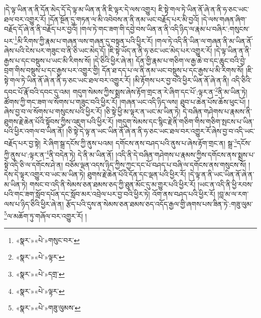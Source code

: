 །དེ་ལྟ་ཡིན་ན་ནི་དོན་མེད་དོ་དེ་ལྟ་མ་ཡིན་ན་ནི་ཇི་ལྟར་དེ་ལས་འགྱུར། ཇི་སྟེ་གལ་ཏེ་ཡིན་ནོ་ཞེ་ན་ནི་ཧ་ཅང་ཡང་ཐལ་བར་འགྱུར་རོ། །དོན་སྔོན་དུ་གཏན་ལ་མི་འབེབས་ན་ནི་ནམ་ཡང་བརྗོད་པར་མི་བྱའོ། །དེ་ལས་གཞན་ཞིག་བརྗོད་དོ་ཞེ་ན་ནི་བརྗོད་པར་བྱའོ། །གལ་ཏེ་གང་ཟག་གི་དབྱེ་བས་ཡིན་ན་ནི་འདི་ཉིད་ལ་རྣམ་པ་བཞིར་:གསུངས་པར་\footnote{«སྣར་»«པེ་»གསུང་བར་}མི་རིགས་ཀྱི་རྣམ་པ་གཞན་ལས་གཞན་དུ་བསྟན་པའི་ཕྱིར་རོ། །གལ་ཏེ་འདི་ནི་ཡིན་ལ་གཞན་ནི་མ་ཡིན་ནོ་ཞེས་པའི་ངེས་པར་གཟུང་བ་ནི་ཅི་ཡང་མེད་དོ། །ཇི་སྟེ་ཡོད་ན་ནི་ཧ་ཅང་ཡང་མེད་པར་འགྱུར་རོ། །དེ་ལྟ་ཡིན་ན་ནི་རྒྱས་པ་དང་བསྡུས་པ་ཡང་མི་རིགས་སོ། །དེ་ཅིའི་ཕྱིར་ཞེ་ན། དོན་གྱི་རྣམ་པ་གཅིག་ལ་རྒྱ་ཆེ་བ་དང་ཆུང་བའི་བྱེ་བྲག་གིས་བསྡུས་པ་དང་རྒྱས་པར་འགྱུར་གྱི། དོན་ཐ་དད་པ་ལ་ནི་ནམ་ཡང་བསྡུས་པ་དང་རྒྱས་པ་མི་རིགས་སོ། །ཇི་སྟེ་གལ་ཏེ་ཡིན་ནོ་ཞེ་ན་ནི་ཧ་ཅང་ཡང་ཐལ་བར་འགྱུར་རོ། །མི་རྟོགས་པར་བྱ་བའི་ཕྱིར་ཡིན་ནོ་ཞེ་ན་ནི། འདི་ཅིའི་དབང་པོ་རྣོ་བའི་དབང་དུ་འམ། གདུག་སེམས་ཀྱིས་སྨྲས་ཞེས་རྟོག་གྲང་ན་རེ་ཞིག་དང་པོ་:ལྟར་ན་\footnote{«སྣར་»«པེ་»ལྟར་}ནི་མ་ཡིན་ཏེ། ཚོགས་ཀྱི་གང་ཟག་ལ་སོགས་པ་གཟུང་བའི་ཕྱིར་རོ། །གཞན་ཡང་འདི་ཉིད་ལས། ཐུབ་པ་ཆེན་པོས་ཆོས་ཕུང་པོ། །ཞེས་བྱ་བ་ལ་སོགས་པ་གསུངས་པའི་ཕྱིར་རོ། །ཅི་སྟེ་ཕྱི་མ་ལྟར་ན་ཡང་མ་ཡིན་ཏེ། དེ་བཞིན་གཤེགས་པ་རྣམས་ནི་ཐུགས་རྗེ་ཆེན་པོའི་སྟོབས་ཀྱིས་འཇུག་པའི་ཕྱིར་རོ། །གདུག་སེམས་དང་སྙིང་རྗེ་ནི་གཅིག་གིས་གཅིག་སྤངས་པ་ཡིན་པའི་ཕྱིར་འགལ་བ་ཡིན་ནོ། །ཅི་སྟེ་དེ་ལྟ་ན་ཡང་ཡིན་ནོ་ཞེ་ན་ནི་ཧ་ཅང་ཡང་ཐལ་བར་འགྱུར་རོ་ཞེས་བྱ་བ་འདི་ཡང་བརྗོད་པར་བྱ་སྟེ། རེ་ཞིག་སྒྲ་དངོས་ཀྱི་ནུས་པའམ། དགོངས་ནས་བཤད་པའི་ནུས་པ་ཞེས་རྟོག་གྲང་ན། སྒྲ་\footnote{«སྣར་»«པེ་»དགྲ་}དངོས་ཀྱི་ནུས་པ་:ལྟར་ན་\footnote{«སྣར་»«པེ་»ལྟར་}ནི་བདེན་ཏེ། དེ་ནི་མ་ཡིན་ནོ། །འདི་ནི་དེ་བཞིན་གཤེགས་པ་རྣམས་ཀྱིས་དགོངས་ནས་སྨྲས་པ་སྟེ་འདི་ཅི་ལ་དགོངས་ཤེ་ན། བཅོམ་ལྡན་འདས་ཉིད་ཀྱིས་ཀྱང་དང་པོ་བཤད་པ་བཞི་ལ་དགོངས་ནས་གསུངས་སོ། །དེས་དེ་ལྟར་འགྱུར་བ་ཡང་མ་ཡིན་ཏེ། ཐུགས་རྗེ་ཆེན་པོའི་དོན་དང་ལྡན་པའི་ཕྱིར་རོ། །དེ་ལྟ་ན་ནི་ཡང་ཡིན་ནོ་ཞེ་ན་མ་ཡིན་ཏེ། གསང་བ་འདི་ནི་སེམས་ཅན་ཐམས་ཅད་ཀྱི་ཐུན་མོང་དུ་མ་གྱུར་པའི་ཕྱིར་རོ། །ཡང་ན་འདི་ནི་ཕྱི་རབས་པའི་གང་ཟག་སློབ་དཔོན་དང་སློབ་མར་འབྲེལ་པར་བྱ་བའི་ཕྱིར་ཏེ། འོག་ནས་བཤད་པའི་ཕྱིར་རོ། །བླ་མ་ལ་རག་ལས་པ་ཉིད་ཅིའི་ཕྱིར་ཞེ་ན། རྩོད་པའི་དུས་ན་སེམས་ཅན་ཐམས་ཅད་འདོད་རྒྱལ་གྱི་ཞགས་པས་ཟིན་ཏེ་:གཟུ་ལུམ་\footnote{«སྣར་»«པེ་»གཟུ་ལུམས་}ལ་མཆོག་ཏུ་གཞོལ་བར་འགྱུར་རོ། །

